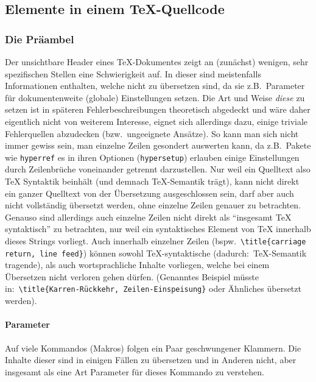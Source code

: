 \newpage

\subsection{Elemente in einem \TeX{}-Quellcode}
\subsubsection{Die Präambel}
Der unsichtbare Header eines \TeX{}-Dokumentes zeigt an (zunächst) wenigen, sehr spezifischen Stellen eine Schwierigkeit auf. In dieser sind meistenfalls Informationen enthalten, welche nicht zu übersetzen sind, da sie z.B.\ Parameter für dokumentenweite (globale) Einstellungen setzen. Die Art und Weise \textit{diese} zu setzen ist in späteren Fehlerbeschreibungen theoretisch abgedeckt und wäre daher eigentlich nicht von weiterem Interesse, eignet sich allerdings dazu, einige triviale Fehlerquellen abzudecken (bzw.\ ungeeignete Ansätze). 
So kann man sich nicht immer gewiss sein, man einzelne Zeilen gesondert auswerten kann, da z.B.\ Pakete wie \texttt{hyperref} es in ihren Optionen (\texttt{hypersetup}) erlauben einige Einstellungen durch Zeilenbrüche voneinander getrennt darzustellen. Nur weil ein Quelltext also \TeX{} Syntaktik beinhält (und demnach \TeX{}-Semantik trägt), kann nicht direkt ein ganzer Quelltext von der Übersetzung ausgeschlossen sein, darf aber auch nicht vollständig übersetzt werden, ohne einzelne Zeilen genauer zu betrachten.%
Genauso sind allerdings auch einzelne Zeilen nicht direkt als \enquote{insgesamt \TeX{} syntaktisch} zu betrachten, nur weil ein syntaktisches Element von \TeX{} innerhalb dieses Strings vorliegt. Auch innerhalb einzelner Zeilen (bspw.\ \verb|\title{carriage return, line feed}|) können sowohl \TeX{}-syntaktische (dadurch:\ \TeX{}-Semantik tragende), als auch wortsprachliche Inhalte vorliegen, welche bei einem Übersetzen nicht verloren gehen dürfen. (Genanntes Beispiel müsste in:\ \verb|\title{Karren-Rückkehr, Zeilen-Einspeisung}| oder Ähnliches übersetzt werden).



\paragraph*{Parameter}
Auf viele Kommandos (Makros) folgen ein Paar geschwungener Klammern. Die Inhalte dieser sind in einigen Fällen zu übersetzen und in Anderen nicht, aber insgesamt als eine Art Parameter für dieses Kommando zu verstehen. 


